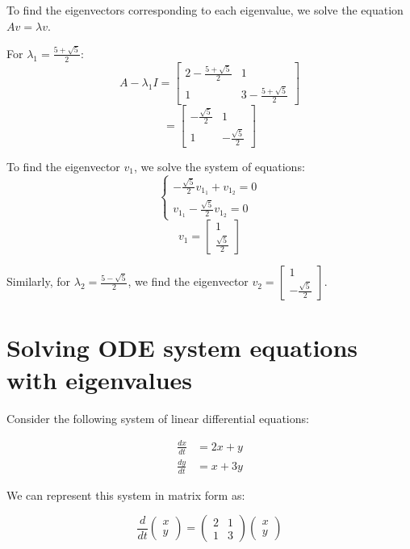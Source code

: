 \documentclass[a4paper,12pt]{article}
\begin{document}
To find the eigenvectors corresponding to each eigenvalue, we solve the equation \(Av = \lambda v\).

For \(\lambda_1 = \frac{5 + \sqrt{5}}{2}\):
\[
A - \lambda_1 I = \begin{bmatrix} 2 - \frac{5 + \sqrt{5}}{2} & 1 \\ 1 & 3 - \frac{5 + \sqrt{5}}{2} \end{bmatrix}
\]
\[
= \begin{bmatrix} -\frac{\sqrt{5}}{2} & 1 \\ 1 & -\frac{\sqrt{5}}{2} \end{bmatrix}
\]

To find the eigenvector \(v_1\), we solve the system of equations:
\[
\begin{cases}
-\frac{\sqrt{5}}{2}v_{1_1} + v_{1_2} = 0 \\
v_{1_1} - \frac{\sqrt{5}}{2}v_{1_2} = 0
\end{cases}
\]
\[
v_1 = \begin{bmatrix} 1 \\ \frac{\sqrt{5}}{2} \end{bmatrix}
\]

Similarly, for \(\lambda_2 = \frac{5 - \sqrt{5}}{2}\), we find the eigenvector \(v_2 = \begin{bmatrix} 1 \\ -\frac{\sqrt{5}}{2} \end{bmatrix}\).


\section{Solving ODE system equations with eigenvalues}

Consider the following system of linear differential equations:

\begin{align*}
\frac{dx}{dt} &= 2x + y \\
\frac{dy}{dt} &= x + 3y
\end{align*}

We can represent this system in matrix form as:

\begin{equation*}
\frac{d}{dt}
\begin{pmatrix}
x \\
y
\end{pmatrix}
=
\begin{pmatrix}
2 & 1 \\
1 & 3
\end{pmatrix}
\begin{pmatrix}
x \\
y
\end{pmatrix}
\end{equation*}
\end{document}
